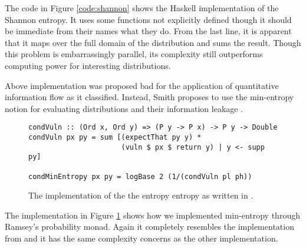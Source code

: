 The code in Figure \ref{code:shannon} shows the Haskell implementation of the
Shannon entropy. It uses some functions not explicitly defined though it should be
immediate from their names what they do. From the last line, it is apparent that it
maps over the full domain of the distribution and sums the result. Though this
problem is embarrassingly parallel, its complexity still outperforms computing power
for interesting distributions.

Above implementation was proposed bad for the application of quantitative information
flow as it classified. Instead, Smith proposes to use the min-entropy notion for evaluating
distributions and their information leakage \cite{Smith:2009}.

\begin{figure}[H]
\begin{verbatim}
condVuln :: (Ord x, Ord y) => (P y -> P x) -> P y -> Double
condVuln px py = sum [(expectThat py y) * 
                      (vuln $ px $ return y) | y <- supp py]

condMinEntropy px py = logBase 2 (1/(condVuln pl ph))
\end{verbatim}
\caption{The implementation of the the entropy entropy as written in \cite{Smith:2009}.}
\label{code:min-entropy}
\end{figure}

The implementation in Figure \ref{code:min-entropy} shows how we implemented min-entropy through
Ramsey's probability monad. Again it completely resembles the implementation
from \cite{Smith:2009} and it has the same complexity concerns as the other implementation.

